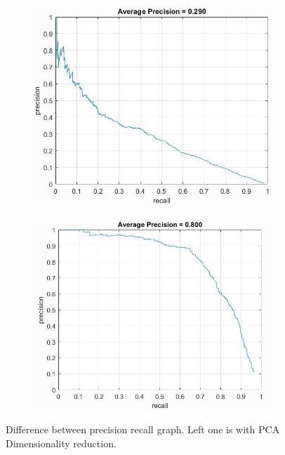 \documentclass{article}
\begin{document}
\begin{figure}[!htb]
\begin{subfigure}{.48\textwidth}
  \centering
  \includegraphics[width=.99\textwidth]{pca.jpg}
\end{subfigure}
\begin{subfigure}{.48\textwidth}
  \centering
  \includegraphics[width=.99\textwidth]{non_pca.jpg}
\end{subfigure}
\caption{Difference between precision recall graph. Left one is with PCA Dimensionality reduction.}
\end{figure}
\end{document}
